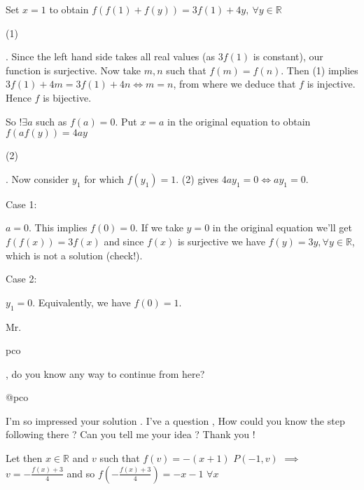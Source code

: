 \begin{solution}
	Set $x=1$ to obtain $f(f(1)+f(y))=3f(1)+4y, \ \forall y\in\mathbb{R}$ \begin{bolded}(1)\end{bolded}. Since the left hand side takes all real values (as $3f(1)$ is constant), our function is surjective. Now take $m,n$ such that $f(m)=f(n)$. Then (1) implies $3f(1)+4m=3f(1)+4n \Leftrightarrow m=n$, from where we deduce that $f$ is injective. Hence $f$ is bijective.

So $!\exists a$ such as $f(a)=0$. Put $x=a$ in the original equation to obtain $f(af(y))=4ay$ \begin{bolded}(2)\end{bolded}. Now consider $y_1$ for which $f(y_1)=1$. (2) gives $4ay_1=0 \Leftrightarrow ay_1=0$.

\begin{bolded}Case 1:\end{bolded} $a=0$.
This implies $f(0)=0$. If we take $y=0$ in the original equation we'll get $f(f(x))=3f(x)$ and since $f(x)$ is surjective we have $f(y)=3y,\forall y\in\mathbb{R}$, which is not a solution (check!).

\begin{bolded}Case 2:\end{bolded} $y_1=0$.
Equivalently, we have $f(0)=1$.


Mr. \begin{bolded}pco\end{bolded}, do you know any way to continue from here?
\end{solution}



\begin{solution}
	\begin{bolded}@pco\end{bolded} I'm so impressed your solution . I've a question , How could you know the step following there ? Can you tell me your idea ? Thank you !
\begin{tcolorbox}
Let then $x\in\mathbb R$ and $v$ such that $f(v)=-(x+1)$
$P(-1,v)$ $\implies$ $v=-\frac{f(x)+3}4$ and so $f(-\frac{f(x)+3}4)=-x-1$ $\forall x$
\end{tcolorbox}
\end{solution}



